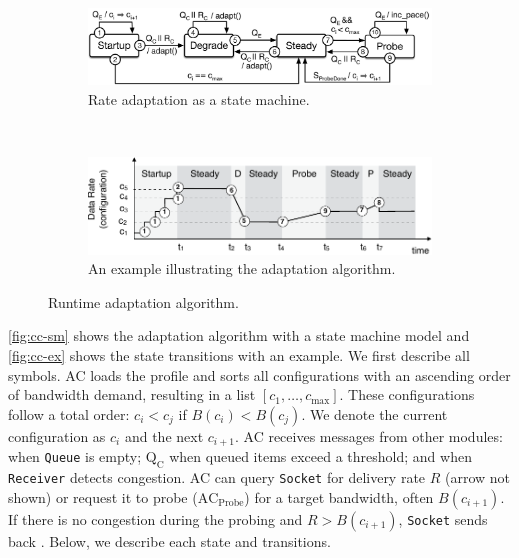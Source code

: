 \begin{figure}
  \begin{subfigure}[t]{\columnwidth}
    \centering
    \includegraphics[width=0.9\columnwidth]{figures/cc.pdf}
    \caption{Rate adaptation as a state machine.}
    \label{fig:cc-sm}
  \end{subfigure}
  \\
  \vspace{1em}
  \centering
  \begin{subfigure}[t]{\columnwidth}
    \centering
    \includegraphics[width=0.85\columnwidth]{figures/cc2.pdf}
    \caption{An example illustrating the adaptation algorithm.}
    \label{fig:cc-ex}
  \end{subfigure}
  \caption{Runtime adaptation algorithm.}
  \label{fig:cc}
\end{figure}

\autoref{fig:cc-sm} shows the adaptation algorithm with a state machine model
and \autoref{fig:cc-ex} shows the state transitions with an example. We first
describe all symbols. AC loads the profile and sorts all configurations with an
ascending order of bandwidth demand, resulting in a list
$[c_1, \dots, c_{\max}]$.  These configurations follow a total order:
$c_i < c_j$ if $B(c_i) < B(c_j)$.  We denote the current configuration as $c_i$
and the next $c_{i+1}$.  AC receives messages from other modules: \qe{} when
\texttt{Queue} is empty; $\text{Q}_\text{C}$ when queued items exceed a
threshold; and \rc{} when \texttt{Receiver} detects congestion. AC can query
\texttt{Socket} for delivery rate $R$ (arrow not shown) or request it to probe
($\text{AC}_{\text{Probe}}$) for a target bandwidth, often $B(c_{i+1})$. If
there is no congestion during the probing and $R > B(c_{i+1})$, \texttt{Socket}
sends back \spd{}. Below, we describe each state and transitions.

